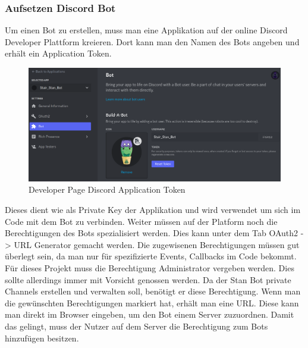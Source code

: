 \documentclass[a4paper, table]{article}
\begin{document}
\subsubsection{Aufsetzen Discord Bot}
Um einen Bot zu erstellen, muss man eine Applikation auf der online Discord Developer Plattform kreieren.
Dort kann man den Namen des Bots angeben und erhält ein Application Token.
\begin{figure}[h]
    \centering
    \includegraphics[width=1\textwidth]{img/discord_developer_bot.png}
    \caption{Developer Page Discord Application Token}
    \label{fig:delevoper-application-token}
\end{figure}
Dieses dient wie als Private Key der Applikation und wird verwendet um sich im Code mit dem Bot zu verbinden.
Weiter müssen auf der Platform noch die Berechtigungen des Bots spezialisiert werden.
Dies kann unter dem Tab OAuth2 -> URL Generator gemacht werden.
Die zugewisenen Berechtigungen müssen gut überlegt sein, da man nur für spezifizierte Events, Callbacks im Code bekommt.
Für dieses Projekt muss die Berechtigung Administrator vergeben werden.
Dies sollte allerdings immer mit Vorsicht genossen werden.
Da der Stan Bot private Channels erstellen und verwalten soll, benötigt er diese Berechtigung.
Wenn man die gewünschten Berechtigungen markiert hat, erhält man eine URL.
Diese kann man direkt im Browser eingeben, um den Bot einem Server zuzuordnen.
Damit das gelingt, muss der Nutzer auf dem Server die Berechtigung zum Bots hinzufügen besitzen. 
\end{document}
